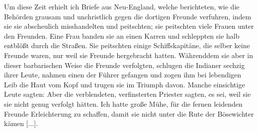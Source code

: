 Um diese Zeit erhielt ich Briefe aus Neu-England, welche
berichteten, wie die Behörden grausam und unchristlich gegen die
dortigen Freunde verfuhren, indem sie sie abscheulich misshandelten
und peitschten; sie peitschten viele Frauen unter den Freunden.
Eine Frau banden sie an einen Karren und schleppten sie 
halb entblößt durch die Straßen. Sie peitschten einige Schiffskapitäne,
die selber keine Freunde waren, nur weil sie Freunde hergebracht
hatten. Währenddem sie aber in dieser barbarischen Weise die
Freunde verfolgten, schlugen die Indianer sechzig ihrer Leute,
nahmen einen der Führer gefangen und zogen ihm bei lebendigen
Leib die Haut vom Kopf und trugen sie im Triumph davon.
Manche einsichtige Leute sagten:  Aber die verblendeten,
verfinsterten Priester sagten, es sei, weil sie sie nicht genug 
verfolgt hätten. Ich hatte große Mühe, für die fernen leidenden
Freunde Erleichterung zu schaffen, damit sie nicht unter die Rute
der Bösewichter kämen [...].

